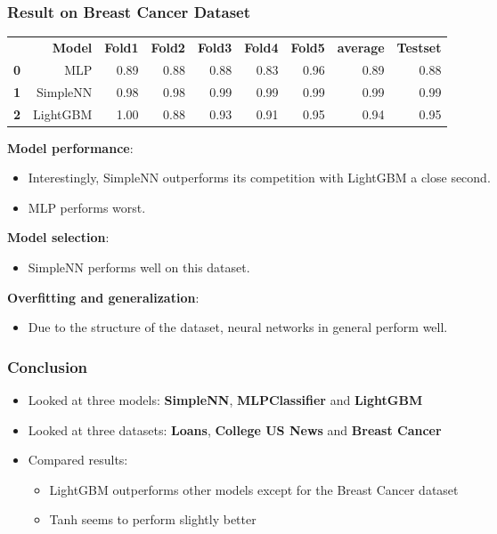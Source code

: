 \documentclass[10pt]{beamer}
\begin{document}
\begin{frame}
\frametitle{Result on Breast Cancer Dataset}
\begin{table}
\centering
\scriptsize
\begin{tabularx}{\textwidth}{rrrrrrrrr}
 & \textbf{Model} & \textbf{Fold1} & \textbf{Fold2} & \textbf{Fold3} & \textbf{Fold4} & \textbf{Fold5} & \textbf{average} & \textbf{Testset} \\
\textbf{0} & MLP & 0.89 & 0.88 & 0.88 & 0.83 & 0.96 & 0.89 & 0.88 \\
\textbf{1} & SimpleNN & 0.98 & 0.98 & 0.99 & 0.99 & 0.99 & 0.99 & 0.99 \\
\textbf{2} & LightGBM & 1.00 & 0.88 & 0.93 & 0.91 & 0.95 & 0.94 & 0.95
\end{tabularx}
\end{table}

\scriptsize
\textbf{Model performance}: 
\begin{itemize}
\item Interestingly, SimpleNN outperforms its competition with LightGBM a close second.
\item MLP performs worst.
\end{itemize}

\textbf{Model selection}:
\begin{itemize} 
\item SimpleNN performs well on this dataset.
\end{itemize}

\textbf{Overfitting and generalization}:
\begin{itemize}
\item Due to the structure of the dataset, neural networks in general perform well.
\end{itemize}
\end{frame}

\begin{frame}
\frametitle{Conclusion}
\begin{itemize}
\item Looked at three models: \textbf{SimpleNN}, \textbf{MLPClassifier} and \textbf{LightGBM}
\item Looked at three datasets: \textbf{Loans}, \textbf{College US News} and \textbf{Breast Cancer}
\item Compared results:
\begin{itemize}
\item LightGBM outperforms other models except for the Breast Cancer dataset
\item Tanh seems to perform slightly better
\end{itemize}
\end{itemize}
\end{frame}
\end{document}

